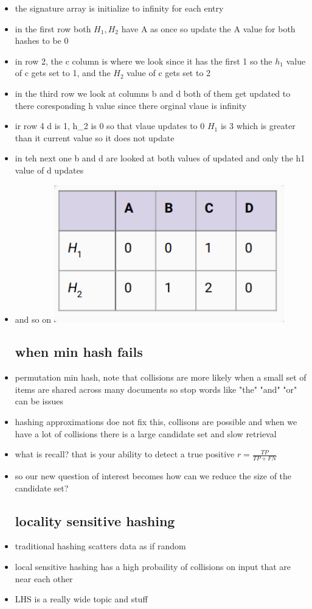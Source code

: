 \documentclass{article}
\begin{document}
\begin{itemize}
\item the signature array is initialize to infinity for each entry
\item in the first row both $H_1, H_2$ have A as once so update the A value for both hashes to be 0
\item in row 2, the c column is where we look since it has the first 1 so the $h_1$ value of c gets set to 1, and the $H_2$ value of c gets set to 2 
\item in the third row we look at columns b and d both of them get updated to there coresponding h value since there orginal vlaue is infinity
\item ir row 4 d is 1, h\_2 is 0 so that vlaue updates to 0 $H_1$ is 3 which is greater than it current value so it does not update 
\item in teh next one b and d are looked at both values of  updated and only the h1 value of d updates
\item and so on \includegraphics*[width=10cm ]{images/Screenshot 2023-05-11 at 2.13.37 AM.png}
\subsection*{when min hash fails}
\item permutation min hash, note that collisions are more likely when a small set of items are shared across many documents so stop words like "the" "and" "or" can be issues
\item hashing approximations doe not fix this, collisons are possible and when we have a lot of collisions there is a large candidate set and slow retrieval 
\item what is recall? that is your ability to detect a true positive $r=\frac{TP}{TP+FN}$
\item so our new question of interest becomes how can we reduce the size of the candidate set?
\subsection*{locality sensitive hashing}
\item traditional hashing scatters data as if random 
\item local sensitive hashing has a high probaility of collisions on input that are near each other 
\item LHS is a really wide topic and stuff


\end{itemize}
\end{document}
